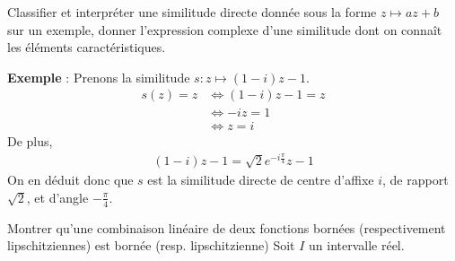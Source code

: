 \documentclass{article}
\begin{document}
\begin{question_kholle}{Classifier et interpréter une similitude directe donnée sous la forme $z \mapsto a z + b$ sur un exemple, donner l'expression complexe d'une similitude dont on connaît les éléments caractéristiques.}
\begin{itemize}[label=$\lozenge$]
\begin{itemize}[label=$\star$]
		      \end{itemize}
	\end{itemize}
	\textbf{Exemple} : Prenons la similitude $s: z \mapsto (1 - i) z - 1$.
	\begin{align*}
		s(z) = z & \iff (1 - i)z - 1 = z \\
		         & \iff -iz = 1          \\
		         & \iff z = i
	\end{align*}
	De plus,
	\begin{align*}
		(1 - i)z - 1 = \sqrt{2}e^{-i \frac{\pi}{4}}z - 1
	\end{align*}
	On en déduit donc que $s$ est la similitude directe de centre d'affixe $i$, de rapport $\sqrt{2}$, et d'angle $-\frac{\pi}{4}$.
\end{question_kholle}
\begin{question_kholle}{Montrer qu'une combinaison linéaire de deux fonctions bornées (respectivement lipschitziennes) est bornée (resp. lipschitzienne)}
	Soit $I$ un intervalle réel.


\end{question_kholle}
\end{document}
